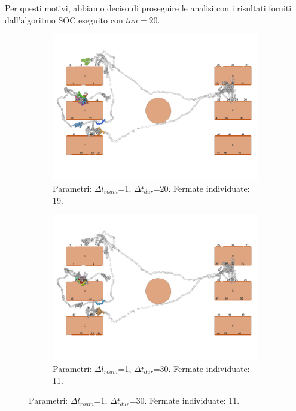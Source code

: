 \documentclass[12pt]{article}
\begin{document}
Per questi motivi, abbiamo deciso di proseguire le analisi con i risultati forniti dall'algoritmo SOC eseguito con $tau=20$.
\begin{figure}[htb!]
    \centering
    \begin{subfigure}[b]{0.45\textwidth}
        \centering
        \includegraphics[width=\textwidth]{images/stop_points_p57_PMLH_r1_s20.png}
        \caption{Parametri: $\Delta l_{roam}$=1, $\Delta t_{dur}$=20. Fermate individuate: 19.}
        \label{stop_points_p57_PMLH_r1_s20}
    \end{subfigure}
    \hfill
    \begin{subfigure}[b]{0.45\textwidth}
        \centering
        \includegraphics[width=\textwidth]{images/stop_points_p57_PMLH_r1_s30.png}
        \caption{Parametri: $\Delta l_{roam}$=1, $\Delta t_{dur}$=30. Fermate individuate: 11.}

\end{subfigure}
\end{figure}
\end{document}
